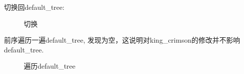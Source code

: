 \documentclass[supercite]{Experimental_Report}
\theoremstyle{definition}
\begin{document}
\noindent
切换回default\_tree:
\begin{figure}[H]
	\centering
	\centering
	\caption{切换}
	\label{fig5-90}
\end{figure}

\clearpage
\noindent
前序遍历一遍default\_tree, 发现为空，这说明对king\_crimson的修改并不影响default\_tree.
\begin{figure}[htbp]
	\centering
	\centering
	\caption{遍历default\_tree}
	\label{fig5-91}
\end{figure}
\end{document}

